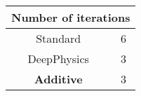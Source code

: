\documentclass[varwidth=10.5cm,border=2mm]{standalone}
\begin{document}
    \begin{center}
        \begin{table}[htbp]
            \centering
            \begin{tabular}{cc}
                \toprule
                \multicolumn{2}{c}{\textbf{Number of iterations}} \\
                \midrule
                Standard & 6 \\
                \cmidrule(lr){1-2}
                DeepPhysics & 3 \\
                \cmidrule(lr){1-2}
                \textbf{Additive} & 3 \\
                \bottomrule
            \end{tabular}
        \end{table}
    \end{center}
\end{document}
